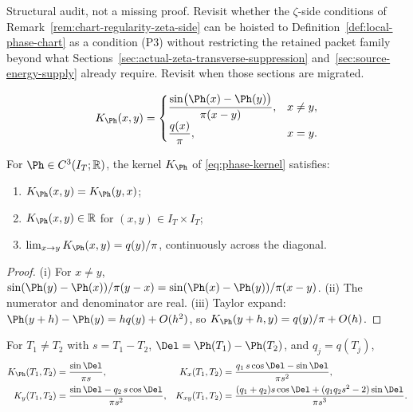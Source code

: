 \begin{wip}\label{rem:wip-audit-chart-regularity-placement}
Structural audit, not a missing proof.  Revisit whether the
\(\zeta\)-side conditions of
Remark~\ref{rem:chart-regularity-zeta-side} can be hoisted to
Definition~\ref{def:local-phase-chart} as a condition (P3) without
restricting the retained packet family beyond what
Sections~\ref{sec:actual-zeta-transverse-suppression}
and~\ref{sec:source-energy-supply} already require.  Revisit when
those sections are migrated.
\end{wip}

\begin{definition}
\label{def:phase-kernel}
\begin{equation}
\label{eq:phase-kernel}
K_\Ph(x,y)=
\begin{cases}
\dfrac{\sin\bigl(\Ph(x)-\Ph(y)\bigr)}{\pi(x-y)}, & x\ne y,\\[1.2ex]
\dfrac{q(x)}{\pi}, & x=y.
\end{cases}
\end{equation}
\end{definition}

\begin{lemma}
\label{lem:phase-kernel-properties}
For \(\Ph\in C^3(I_T;\mathbb R)\), the kernel \(K_\Ph\) of
\eqref{eq:phase-kernel} satisfies:
\begin{enumerate}[label=\textup{(\roman*)},leftmargin=*]
\item \(K_\Ph(x,y) = K_\Ph(y,x)\);
\item \(K_\Ph(x,y)\in\mathbb R\) for \((x,y)\in I_T\times I_T\);
\item \(\lim_{x\to y} K_\Ph(x,y) = q(y)/\pi\), continuously across
  the diagonal.
\end{enumerate}
\end{lemma}

\begin{proof}
(i) For \(x\ne y\),
\(\sin(\Ph(y)-\Ph(x))/\pi(y-x) = \sin(\Ph(x)-\Ph(y))/\pi(x-y)\).
(ii) The numerator and denominator are real.
(iii) Taylor expand: \(\Ph(y+h)-\Ph(y) = h q(y) + O(h^2)\), so
\(K_\Ph(y+h,y) = q(y)/\pi + O(h)\).
\end{proof}

\begin{lemma}
\label{lem:phase-kernel-derivatives}
For \(T_1\ne T_2\) with \(s = T_1 - T_2\),
\(\Del = \Ph(T_1) - \Ph(T_2)\), and \(q_j = q(T_j)\),
\begin{align*}
K_\Ph(T_1, T_2) &= \frac{\sin\Del}{\pi s},
&K_x(T_1, T_2) &= \frac{q_1\, s\cos\Del - \sin\Del}{\pi s^2},\\
K_y(T_1, T_2) &= \frac{\sin\Del - q_2\, s\cos\Del}{\pi s^2},
&K_{xy}(T_1, T_2)
&= \frac{(q_1+q_2)s\cos\Del + (q_1 q_2 s^2 - 2)\sin\Del}{\pi s^3}.
\end{align*}
\end{lemma}

